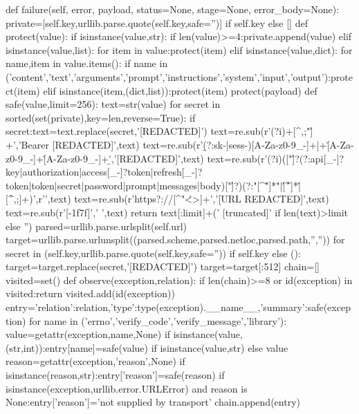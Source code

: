 {    def failure(self, error, payload, status=None, stage=None, error_body=None):
        private=[self.key,urllib.parse.quote(self.key,safe='')] if self.key else []
        def protect(value):
            if isinstance(value,str):
                if len(value)>=4:private.append(value)
            elif isinstance(value,list):
                for item in value:protect(item)
            elif isinstance(value,dict):
                for name,item in value.items():
                    if name in ('content','text','arguments','prompt','instructions','system','input','output'):protect(item)
                    elif isinstance(item,(dict,list)):protect(item)
        protect(payload)
        def safe(value,limit=256):
            text=str(value)
            for secret in sorted(set(private),key=len,reverse=True):
                if secret:text=text.replace(secret,'[REDACTED]')
            text=re.sub(r'(?i)\bBearer\s+[^\s,;"\']+','Bearer [REDACTED]',text)
            text=re.sub(r'\b(?:sk-|sess-)[A-Za-z0-9_-]+|\beyJ[A-Za-z0-9_-]+\.[A-Za-z0-9_-]+\.[A-Za-z0-9_-]+\b','[REDACTED]',text)
            text=re.sub(r'(?i)(["\']?(?:api[_-]?key|authorization|access[_-]?token|refresh[_-]?token|token|secret|password|prompt|messages|body)["\']?\s*[:=]\s*)(?:"[^"\r\n]*"|\'[^\'\r\n]*\'|[^\r\n,;]+)',r'\1[REDACTED]',text)
            text=re.sub(r'https?://[^\s"\'<>]+','[URL REDACTED]',text)
            text=re.sub(r'[-\x1f\x7f]',' ',text)
            return text[:limit]+(' [truncated]' if len(text)>limit else '')
        parsed=urllib.parse.urlsplit(self.url)
        target=urllib.parse.urlunsplit((parsed.scheme,parsed.netloc,parsed.path,'',''))
        for secret in (self.key,urllib.parse.quote(self.key,safe='')) if self.key else ():
            target=target.replace(secret,'[REDACTED]')
        target=target[:512]
        chain=[]
        visited=set()
        def observe(exception,relation):
            if len(chain)>=8 or id(exception) in visited:return
            visited.add(id(exception))
            entry={'relation':relation,'type':type(exception).__name__,'summary':safe(exception)}
            for name in ('errno','verify_code','verify_message','library'):
                value=getattr(exception,name,None)
                if isinstance(value,(str,int)):entry[name]=safe(value) if isinstance(value,str) else value
            reason=getattr(exception,'reason',None)
            if isinstance(reason,str):entry['reason']=safe(reason)
            if isinstance(exception,urllib.error.URLError) and reason is None:entry['reason']='not supplied by transport'
            chain.append(entry)
}
